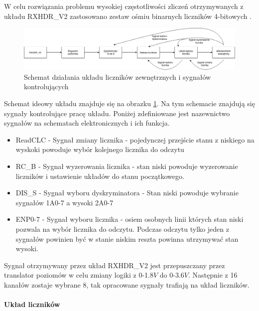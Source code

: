 \documentclass[a4paper,12pt]{article}
\begin{document}
W celu rozwiązania problemu wysokiej częstotliwości zliczeń otrzymywanych z układu RXHDR\_V2 \cite{master} zastosowano zestaw ośmiu binarnych liczników 4-bitowych \cite{licznik doc}. 


\begin{figure}[]
        \centering
        \includegraphics[width=\textwidth]{Elektronika_flow_chart.png}
        \caption{Schemat działania układu liczników zewnętrznych i sygnałów kontrolujących}
        \label{licznik flowchart}
\end{figure}

Schemat ideowy układu znajduje się na obrazku \ref{licznik flowchart}.
Na tym schemacie znajdują się sygnały kontrolujące pracę układu. Poniżej zdefiniowane jest nazewnictwo sygnałów na schematach elektronicznych i ich funkcja.  
\begin{itemize}
        \item ReadCLC - Sygnał zmiany licznika - pojedynczej przejście stanu z niskiego na wyskoki powoduje wybór kolejnego licznika do odczytu
        \item RC\_B - Sygnał wyzerowania licznika - stan niski powoduje wyzerowanie liczników i ustawienie układów do stanu początkowego.
        \item DIS\_S - Sygnał wyboru dyskryminatora - Stan niski powoduje wybranie sygnałów 1A0-7 a wysoki 2A0-7
        \item ENP0-7 - Sygnał wyboru licznika - osiem osobnych linii których stan niski pozwala na wybór licznika do odczytu. Podczas odczytu tylko jeden z sygnałów powinien być w stanie niskim reszta powinna utrzymywać stan wysoki. 
\end{itemize}
Sygnał otrzymywany przez układ RXHDR\_V2 jest przepuszczany przez translator poziomów w celu zmiany logiki z 0-1.8$V$ do 0-3.6$V$. Następnie z 16 kanałów zostaje wybrane 8, tak opracowane sygnały trafiają na układ liczników.

\paragraph{Układ liczników \cite{licznik doc}\cite{slave}}
\end{document}
